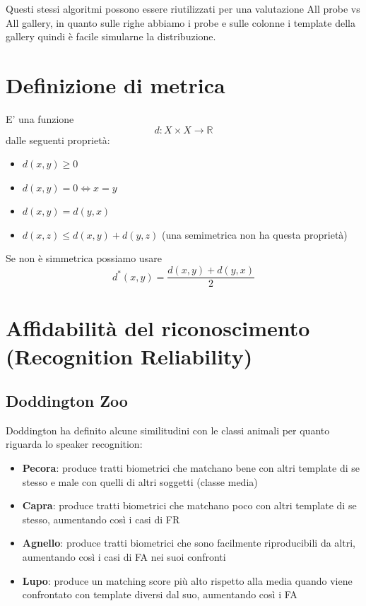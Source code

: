 \documentclass{article}
\begin{document}
Questi stessi algoritmi possono essere riutilizzati per una valutazione All probe vs All gallery, in quanto sulle righe abbiamo i probe e sulle colonne i template della gallery quindi è facile simularne la distribuzione.

\section{Definizione di metrica}
E' una funzione 
$$d: X \times X \rightarrow \mathbb{R}$$
dalle seguenti proprietà:
\begin{itemize}
    \item $d(x,y) \geq 0$
    \item $d(x,y) = 0 \iff x = y$
    \item $d(x,y) = d(y, x)$
    \item $d(x,z) \leq d(x,y) + d(y,z)$ (una semimetrica non ha questa proprietà)
\end{itemize}

Se non è simmetrica possiamo usare $$d^*(x,y) = \frac{d(x,y) + d(y,x)}{2}$$

\section{Affidabilità del riconoscimento (Recognition Reliability)}
\subsection{Doddington Zoo}
Doddington ha definito alcune similitudini con le classi animali per quanto riguarda lo speaker recognition:
\begin{itemize}
    \item \textbf{Pecora}: produce tratti biometrici che matchano bene con altri template di se stesso e male con quelli di altri soggetti (classe media)
    \item \textbf{Capra}: produce tratti biometrici che matchano poco con altri template di se stesso, aumentando così i casi di FR
    \item \textbf{Agnello}: produce tratti biometrici che sono facilmente riproducibili da altri, aumentando così i casi di FA nei suoi confronti
    \item \textbf{Lupo}: produce un matching score più alto rispetto alla media quando viene confrontato con template diversi dal suo, aumentando così i FA
\end{itemize}
\end{document}
